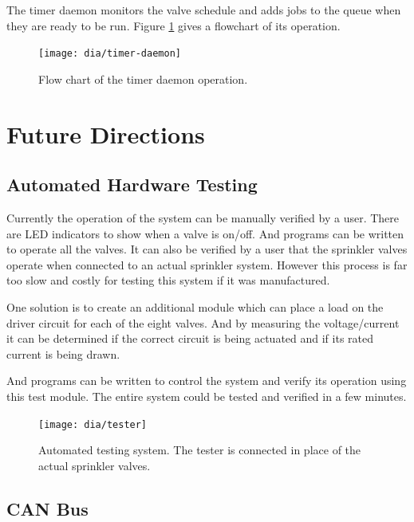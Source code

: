 \documentclass{article}
\begin{document}
The timer daemon monitors the valve schedule and adds jobs
to the queue when they are ready to be run.
Figure \ref{fig:timer-daemon} gives a flowchart of its operation.

\begin{figure}[htbp!]
\begin{center}
\texttt{[image: dia/timer-daemon]}
\end{center}
\caption{Flow chart of the timer daemon operation.}
\label{fig:timer-daemon}
\end{figure}


\section{Future Directions}

\FloatBarrier
\subsection{Automated Hardware Testing}

Currently the operation of the system can be manually
verified by a user.  There are LED indicators to show
when a valve is on/off.  And programs can be written
to operate all the valves.
It can also be verified by a user that the sprinkler
valves operate when connected to an actual sprinkler
system.
However this process is far too slow and costly for
testing this system if it was manufactured.

One solution is to create an additional module which
can place a load on the driver circuit for each of
the eight valves.
And by measuring the voltage/current it can be determined
if the correct circuit is being actuated and if
its rated current is being drawn.

And programs can be written to control the system and
verify its operation using this test module.
The entire system could be tested and verified in a
few minutes.

\begin{figure}[htbp!]
\begin{center}
\texttt{[image: dia/tester]}
\end{center}
\caption{Automated testing system.
The tester is connected in place of the actual sprinkler valves.}
\label{fig:tester}
\end{figure}

\FloatBarrier
\subsection{CAN Bus}
\end{document}
